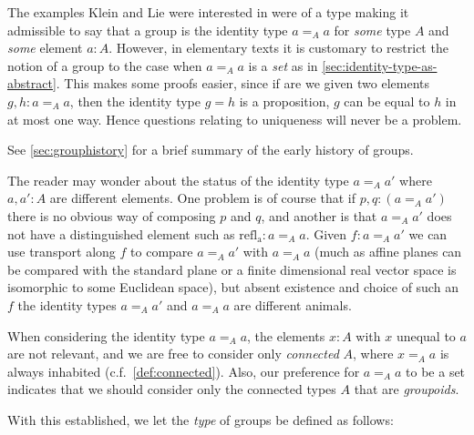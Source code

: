 \begin{definition}
The examples Klein and Lie were interested in were of a type making it admissible to say that a group is the identity type $a=_Aa$ for \emph{some} type $A$ and \emph{some} element $a:A$.
However, in elementary texts it is customary to restrict the notion of a group to the case when $a=_Aa$ is a \emph{set} as in \cref{sec:identity-type-as-abstract}.  This makes some proofs easier, since if are we given two elements $g,h:a=_Aa$, then the identity type $g=h$ is a proposition, \ie $g$ can be equal to $h$ in at most one way.  Hence questions relating to uniqueness will never be a problem.



See \cref{sec:grouphistory} for a brief summary of the early history of groups.
\begin{remark}
  The reader may wonder about the status of the identity type $a=_Aa'$ where $a,a':A$ are different elements.  One problem is of course that if $p,q:(a=_Aa')$ there is no obvious way of composing $p$ and $q$, and another is that $a=_Aa'$ does not have a distinguished element such as $\mathrm{refl{}_a}:a=_Aa$.
Given $f:a=_Aa'$ we can use transport along $f$ to compare $a=_Aa'$ with $a=_Aa$ (much as affine planes can be compared with the standard plane or a finite dimensional real vector space is isomorphic to some Euclidean space), but absent existence and choice of such an $f$ the identity types $a=_Aa'$ and $a=_Aa$ are different animals.
\end{remark}


\begin{remark}
  When considering the identity type $a=_Aa$, the elements $x:A$ with $x$ unequal to $a$ are not relevant, and we are free to consider only \emph{connected} $A$, \ie where $x=_Aa$ is always inhabited (c.f.~\cref{def:connected}).  Also, our preference for $a=_Aa$ to be a set indicates that we should consider only the connected types $A$ that are \emph{groupoids}.
\end{remark}


With this established, we let the \emph{type} of groups be defined as follows:


\end{definition}
